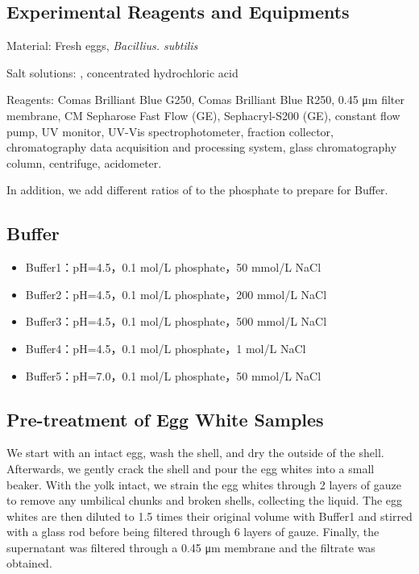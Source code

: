 \subsection{Experimental Reagents and Equipments}

Material: Fresh eggs, \textit{Bacillius. subtilis}

Salt solutions: , concentrated hydrochloric acid

Reagents: Comas Brilliant Blue G250, Comas Brilliant Blue R250, 0.45 μm filter
membrane, CM Sepharose Fast Flow (GE), Sephacryl-S200 (GE), constant
flow pump, UV monitor, UV-Vis spectrophotometer, fraction collector,
chromatography data acquisition and processing system, glass
chromatography column, centrifuge, acidometer.


In addition, we add different ratios of  to the phosphate to prepare for Buffer.

\subsection{Buffer}

\begin{itemize}
	\item Buffer1：pH=4.5，0.1 mol/L phosphate，50 mmol/L NaCl 
	\item Buffer2：pH=4.5，0.1 mol/L phosphate，200 mmol/L NaCl 
	\item Buffer3：pH=4.5，0.1 mol/L phosphate，500 mmol/L NaCl 
	\item Buffer4：pH=4.5，0.1 mol/L phosphate，1 mol/L NaCl 
	\item Buffer5：pH=7.0，0.1 mol/L phosphate，50 mmol/L NaCl
\end{itemize}

\subsection{Pre-treatment of Egg White Samples}

We start with an intact egg, wash the shell, and dry the outside of the
shell. Afterwards, we gently crack the shell and pour the egg whites
into a small beaker. With the yolk intact, we strain the egg whites
through 2 layers of gauze to remove any umbilical chunks and broken
shells, collecting the liquid. The egg whites are then diluted to 1.5
times their original volume with Buffer1 and stirred with a glass rod
before being filtered through 6 layers of gauze. Finally, the
supernatant was filtered through a 0.45 μm membrane and the filtrate was
obtained.

